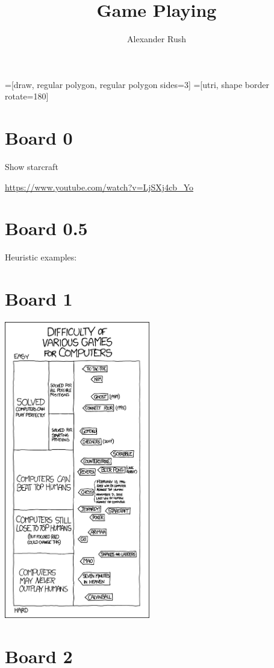 \documentclass[11pt]{article}
\title{Game Playing}
\author{Alexander Rush}
\date{}
\begin{document}
\MakeScribeTop{}

=[draw, regular polygon, regular polygon sides=3]
=[utri, shape border rotate=180]

\tableofcontents

\section{Board 0}

Show starcraft

\url{https://www.youtube.com/watch?v=LjSXj4cb_Yo}


\section{Board 0.5}

Heuristic examples:


\section{Board 1}

\begin{center}
  \includegraphics[height=13cm]{../pics/game_ais}
\end{center}



\section{Board 2}
\end{document}
